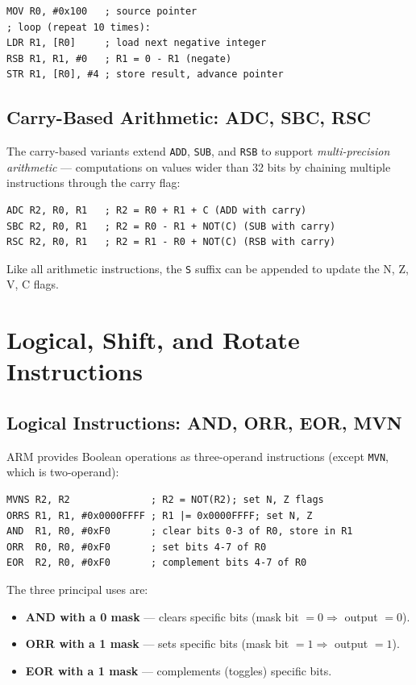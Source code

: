 \documentclass[11pt, a4paper, notitlepage]{report}
\theoremstyle{definition}
\theoremstyle{remark}
\theoremstyle{definition}
\begin{document}
\begin{lstlisting}
MOV R0, #0x100   ; source pointer
; loop (repeat 10 times):
LDR R1, [R0]     ; load next negative integer
RSB R1, R1, #0   ; R1 = 0 - R1 (negate)
STR R1, [R0], #4 ; store result, advance pointer
\end{lstlisting}

\subsection{Carry-Based Arithmetic: ADC, SBC, RSC}

The carry-based variants extend \texttt{ADD}, \texttt{SUB}, and \texttt{RSB} to support \emph{multi-precision arithmetic} --- computations on values wider than 32 bits by chaining multiple instructions through the carry flag:

\begin{lstlisting}
ADC R2, R0, R1   ; R2 = R0 + R1 + C (ADD with carry)
SBC R2, R0, R1   ; R2 = R0 - R1 + NOT(C) (SUB with carry)
RSC R2, R0, R1   ; R2 = R1 - R0 + NOT(C) (RSB with carry)
\end{lstlisting}

Like all arithmetic instructions, the \texttt{S} suffix can be appended to update the N, Z, V, C flags.

\section{Logical, Shift, and Rotate Instructions}

\subsection{Logical Instructions: AND, ORR, EOR, MVN}

ARM provides Boolean operations as three-operand instructions (except \texttt{MVN}, which is two-operand):

\begin{lstlisting}
MVNS R2, R2              ; R2 = NOT(R2); set N, Z flags
ORRS R1, R1, #0x0000FFFF ; R1 |= 0x0000FFFF; set N, Z
AND  R1, R0, #0xF0       ; clear bits 0-3 of R0, store in R1
ORR  R0, R0, #0xF0       ; set bits 4-7 of R0
EOR  R2, R0, #0xF0       ; complement bits 4-7 of R0
\end{lstlisting}

The three principal uses are:

\begin{itemize}
  \item \textbf{AND with a 0 mask} --- clears specific bits (mask bit $= 0 \Rightarrow$ output $= 0$).
  \item \textbf{ORR with a 1 mask} --- sets specific bits (mask bit $= 1 \Rightarrow$ output $= 1$).
  \item \textbf{EOR with a 1 mask} --- complements (toggles) specific bits.
\end{itemize}
\end{document}
